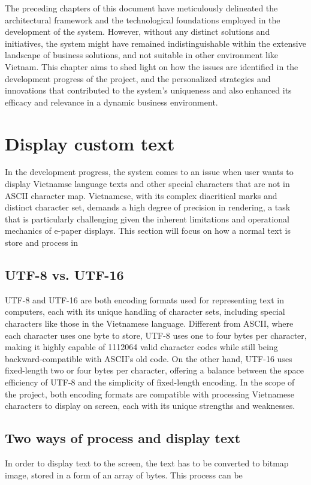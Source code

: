 \documentclass[../Main.tex]{subfiles}
\begin{document}
The preceding chapters of this document have meticulously delineated the architectural framework and the technological foundations employed in the development of the system. However, without any distinct solutions and initiatives, the system might have remained indistinguishable within the extensive landscape of business solutions, and not suitable in other environment like Vietnam. This chapter aims to shed light on how the issues are identified in the development progress of the project, and the personalized strategies and innovations that contributed to the system's uniqueness and also enhanced its efficacy and relevance in a dynamic business environment.

\section{Display custom text}
In the development progress, the system comes to an issue when user wants to display Vietnamse language texts and other special characters that are not in ASCII character map. Vietnamese, with its complex diacritical marks and distinct character set, demands a high degree of precision in rendering, a task that is particularly challenging given the inherent limitations and operational mechanics of e-paper displays. This section will focus on how a normal text is store and process in 

\subsection{UTF-8 vs. UTF-16}
UTF-8 and UTF-16 are both encoding formats used for representing text in computers, each with its unique handling of character sets, including special characters like those in the Vietnamese language. Different from ASCII, where each character uses one byte to store, UTF-8 uses one to four bytes per character, making it highly capable of 1112064 valid character codes while still being backward-compatible with ASCII's old code. On the other hand, UTF-16 uses fixed-length two or four bytes per character, offering a balance between the space efficiency of UTF-8 and the simplicity of fixed-length encoding. In the scope of the project, both encoding formats are compatible with processing Vietnamese characters to display on screen, each with its unique strengths and weaknesses.

\subsection{Two ways of process and display text}
In order to display text to the screen, the text has to be converted to bitmap image, stored in a form of  an array of bytes. This process can be 
\end{document}
